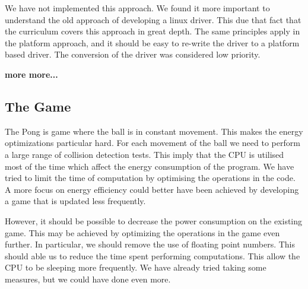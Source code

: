 We have not implemented this approach. We found it more important to understand the old approach of developing a linux driver. This due that fact that the curriculum covers this approach in great depth. The same principles apply in the platform approach, and it should be easy to re-write the driver to a platform based driver. The conversion of the driver was considered low priority. 

{\bf more more...}



\subsection{The Game}
The Pong is game where the ball is in constant movement. This makes the energy optimizations particular hard. For each movement of the ball we need to perform a large range of collision detection tests. This imply that the CPU is utilised most of the time which affect the energy consumption of the program. We have tried to limit the time of computation by optimising the operations in the code. A more focus on energy efficiency could better have been achieved by developing a game that is updated less frequently. 

However, it should be possible to decrease the power consumption on the existing game. This may be achieved by optimizing the operations in the game even further. In particular, we should remove the use of floating point numbers. This should able us to reduce the time spent performing computations. This allow the CPU to be sleeping more frequently. We have already tried taking some measures, but we could have done even more. 










